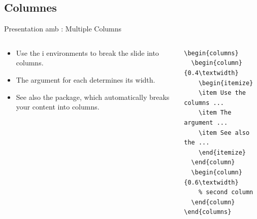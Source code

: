\subsection{Columnes}
\begin{frame}[fragile]{Presentation amb \protect{}: Multiple Columns}
\begin{columns}
\begin{column}{0.4\textwidth}
\begin{itemize}
\item Use the  i  environments to break the slide
into columns.
\item The argument for each  determines its width.
\item See also the  package, which automatically breaks your
content into columns.
\end{itemize}
\end{column}
\begin{column}{0.6\textwidth}
\begin{verbatim}
\begin{columns}
  \begin{column}{0.4\textwidth}
    \begin{itemize}
    \item Use the columns ...
    \item The argument ...
    \item See also the ...
    \end{itemize}
  \end{column}
  \begin{column}{0.6\textwidth}
    % second column
  \end{column}
\end{columns}
\end{verbatim}
\end{column}
\end{columns}
\end{frame}

